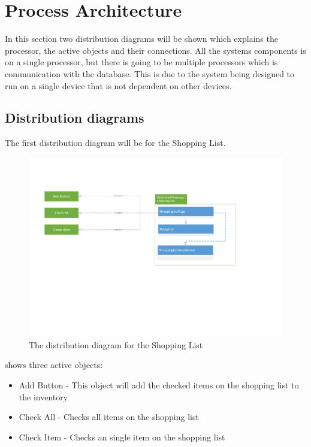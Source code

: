 \section{Process Architecture} \label{ProcessArchitecture}
In this section two distribution diagrams will be shown which explains the processor, the active objects and their connections. All the systems components is on a single processor, but there is going to be multiple processors which is communication with the database. This is due to the system being designed to run on a single device that is not dependent on other devices.

\subsection{Distribution diagrams}
The first distribution diagram will be for the Shopping List.

\begin{figure}[H]
\includegraphics[width =\linewidth, clip=true, trim=1.5cm 8cm 5.5cm 3cm]{Grafik/FoodPlanner/DistributionShoppingList}
\centering
\caption{The distribution diagram for the Shopping List}
\label{SLD}
\end{figure}

 shows three active objects:
\begin{itemize}
\item Add Button 
- This object will add the checked items on the shopping list to the inventory
\item Check All 
- Checks all items on the shopping list 
\item Check Item 
- Checks an single item on the shopping list
\end{itemize}

